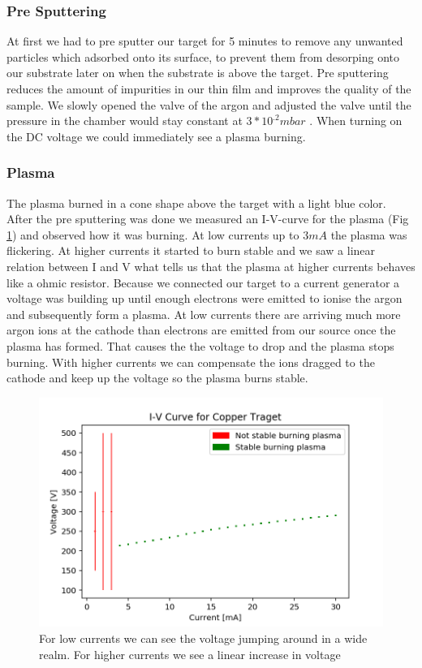 \documentclass[]{article}
\begin{document}
\subsubsection{Pre Sputtering}
At first we had to pre sputter our target for 5 minutes to remove any unwanted particles which adsorbed onto its surface, to prevent them from desorping onto our substrate later on when the substrate is above the target. Pre sputtering reduces the amount of impurities in our thin film and improves the quality of the sample.  We slowly opened the valve of the argon and adjusted the valve until the pressure in the chamber would stay constant at $3*10^{.2}mbar$ . When turning on the DC voltage we could immediately see a plasma burning.

\subsubsection{Plasma}
The plasma burned in a cone shape above the target with a light blue color. After the pre sputtering was done we measured an I-V-curve for the plasma (Fig \ref{fig:ivcurve}) and observed how it was burning. At low currents up to $3mA$ the plasma was flickering. At higher currents it started to burn stable and we saw a linear relation between I and V what tells us that the plasma at higher currents behaves like a ohmic resistor. Because we connected our target to a current generator a voltage was building up until enough electrons were emitted to ionise the argon and subsequently form a plasma. At low currents there are arriving much more argon ions at the cathode than electrons are emitted from our source once the plasma has formed. That causes the the voltage to drop and the plasma stops burning. With higher currents we can compensate the ions dragged to the cathode and keep up the voltage so the plasma burns stable.

\begin{figure}
	\centering
	\includegraphics[width=.8\linewidth]{Plots/IVcurve}
	\caption{For low currents we can see the voltage jumping around in a wide realm. For higher currents we see a linear increase in voltage}
	\label{fig:ivcurve}
\end{figure}
\end{document}
